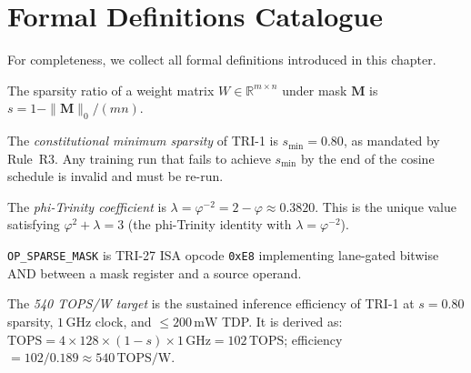 \section{Formal Definitions Catalogue}
\label{sec:formal-defs}

For completeness, we collect all formal definitions introduced in this chapter.

\begin{definition}
The sparsity ratio of a weight matrix $W \in \mathbb{R}^{m \times n}$ under
mask $\mathbf{M}$ is $s = 1 - \|\mathbf{M}\|_0/(mn)$.
\end{definition}

\begin{definition}
The \emph{constitutional minimum sparsity} of TRI-1 is $s_{\min} = 0.80$,
as mandated by Rule~R3.  Any training run that fails to achieve $s_{\min}$ by
the end of the cosine schedule is invalid and must be re-run.
\end{definition}

\begin{definition}
The \emph{phi-Trinity coefficient} is $\lambda = \varphi^{-2} = 2 - \varphi
\approx 0.3820$.  This is the unique value satisfying
$\varphi^2 + \lambda = 3$ (the phi-Trinity identity with $\lambda = \varphi^{-2}$).
\end{definition}

\begin{definition}
\texttt{OP\_SPARSE\_MASK} is TRI-27 ISA opcode \texttt{0xE8} implementing
lane-gated bitwise AND between a mask register and a source operand.
\end{definition}

\begin{definition}
The \emph{540 TOPS/W target} is the sustained inference efficiency of TRI-1
at $s=0.80$ sparsity, $1\,\mathrm{GHz}$ clock, and $\leq 200\,\mathrm{mW}$ TDP.
It is derived as: $\mathrm{TOPS} = 4 \times 128 \times (1-s) \times 1\,\mathrm{GHz}
= 102\,\mathrm{TOPS}$; efficiency $= 102/0.189 \approx 540\,\mathrm{TOPS/W}$.~\cite{blalock2020state}
\end{definition}


